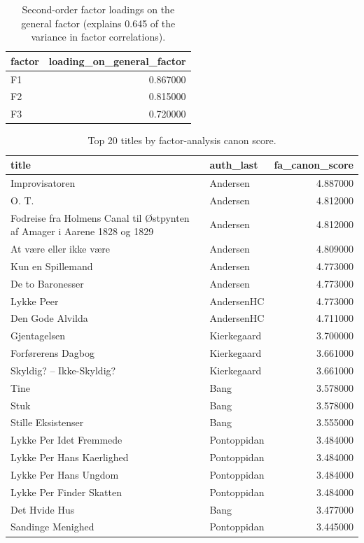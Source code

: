 \begin{table}
\caption{Second-order factor loadings on the general factor (explains 0.645 of the variance in factor correlations).}
\label{tab:full_second_order_loadings}
\begin{tabular}{lr}
\toprule
factor & loading\_on\_general\_factor \\
\midrule
F1 & 0.867000 \\
F2 & 0.815000 \\
F3 & 0.720000 \\
\bottomrule
\end{tabular}
\end{table}


\begin{table}
\caption{Top 20 titles by factor-analysis canon score.}
\label{tab:full_fa_canon_score_top20}
\begin{tabular}{llr}
\toprule
title & auth\_last & fa\_canon\_score \\
\midrule
Improvisatoren  & Andersen & 4.887000 \\
O. T.  & Andersen & 4.812000 \\
Fodreise fra Holmens Canal til Østpynten af Amager i Aarene 1828 og 1829 & Andersen & 4.812000 \\
At være eller ikke være & Andersen & 4.809000 \\
Kun en Spillemand  & Andersen & 4.773000 \\
De to Baronesser & Andersen & 4.773000 \\
Lykke Peer & AndersenHC & 4.773000 \\
Den Gode Alvilda & AndersenHC & 4.711000 \\
Gjentagelsen & Kierkegaard & 3.700000 \\
Forførerens Dagbog  & Kierkegaard & 3.661000 \\
Skyldig? – Ikke-Skyldig? & Kierkegaard & 3.661000 \\
Tine & Bang & 3.578000 \\
Stuk & Bang & 3.578000 \\
Stille Eksistenser & Bang & 3.555000 \\
Lykke Per Idet Fremmede & Pontoppidan & 3.484000 \\
Lykke Per Hans Kaerlighed & Pontoppidan & 3.484000 \\
Lykke Per Hans Ungdom & Pontoppidan & 3.484000 \\
Lykke Per Finder Skatten & Pontoppidan & 3.484000 \\
Det Hvide Hus & Bang & 3.477000 \\
Sandinge Menighed & Pontoppidan & 3.445000 \\
\bottomrule
\end{tabular}
\end{table}


